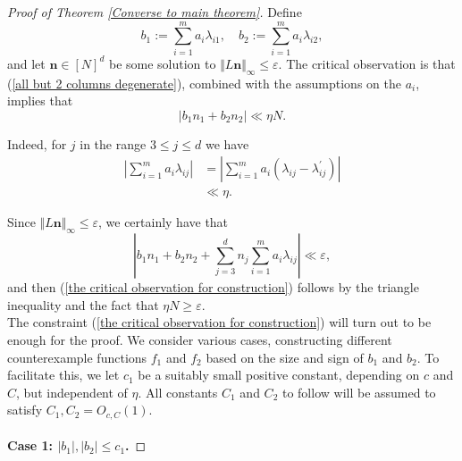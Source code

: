 \documentclass[12pt,a4paper,twoside,reqno]{amsart}
\numberwithin{equation}{section}
\begin{document}
\begin{proof}[Proof of Theorem \ref{Converse to main theorem}]
Define $$b_1:=\sum\limits_{i=1}^m a_i \lambda_{i1}, \quad b_2:= \sum\limits_{i=1}^m a_i \lambda_{i2},$$ and let $\mathbf{n}\in [N]^d$ be some solution to $\Vert L\mathbf{n}\Vert_\infty \leqslant \varepsilon$. The critical observation is that (\ref{all but 2 columns degenerate}), combined with the assumptions on the $a_i$, implies that 
\begin{equation}
\label{the critical observation for construction}
\vert b_1 n_1 + b_2n_2\vert \ll \eta N.
\end{equation}  

Indeed, for $j$ in the range $3\leqslant j\leqslant d$ we have 
\begin{align*}
\left\vert\sum\limits_{i=1}^m a_i\lambda_{ij}\right\vert & = \left\vert\sum\limits_{i=1}^m a_i(\lambda_{ij} - \lambda^\prime_{ij})\right\vert \\
&\ll \eta.
\end{align*} 

\noindent Since $\Vert L\mathbf{n}\Vert_\infty \leqslant \varepsilon$, we certainly have that $$\left\vert b_1 n_1 + b_2n_2 + \sum\limits_{j=3}^d n_j\sum\limits_{i=1}^m a_i \lambda_{ij}\right\vert \ll \varepsilon,$$ and then (\ref{the critical observation for construction}) follows by the triangle inequality and the fact that $\eta N\geqslant \varepsilon$.\\

The constraint (\ref{the critical observation for construction}) will turn out to be enough for the proof. We consider various cases, constructing different counterexample functions $f_1$ and $f_2$ based on the size and sign of $b_1$ and $b_2$. To facilitate this, we let $c_1$ be a suitably small positive constant, depending on $c$ and $C$, but independent of $\eta$. All constants $C_1$ and $C_2$ to follow will be assumed to satisfy $C_1,C_2 = O_{c,C}(1)$. \\\\

\noindent \textbf{Case 1: $\vert b_1\vert,\vert b_2\vert \leqslant c_1$.}


\end{proof}
\end{document}
